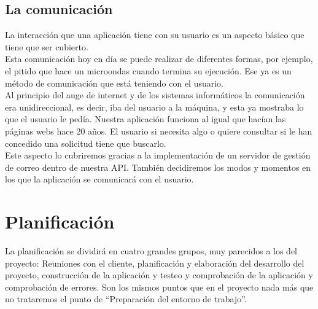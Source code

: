 \subsection{La comunicación}
La interacción que una aplicación tiene con su usuario es un aspecto básico que tiene que ser cubierto.
\\Esta comunicación hoy en día se puede realizar de diferentes formas, por ejemplo, el pitido que hace un microondas cuando termina su ejecución. Ese ya es un método de comunicación que está teniendo con el usuario.
\\Al principio del auge de internet y de los sistemas informáticos la comunicación era unidireccional, es decir, iba del usuario a la máquina, y esta ya mostraba lo que el usuario le pedía. Nuestra aplicación funciona al igual que hacían las páginas webs hace 20 años. El usuario si necesita algo o quiere consultar si le han concedido una solicitud tiene que buscarlo.
\\Este aspecto lo cubriremos gracias a la implementación de un servidor de gestión de correo dentro de nuestra API. También decidiremos los modos y momentos en los que la aplicación se comunicará con el usuario.

\section{Planificación}
La planificación se dividirá en cuatro grandes grupos, muy parecidos a los del proyecto: Reuniones con el cliente, planificación y elaboración del desarrollo del proyecto, construcción de la aplicación y testeo y comprobación de la aplicación y comprobación de errores. Son los mismos puntos que en el proyecto nada más que no trataremos el punto de ``Preparación del entorno de trabajo''.




